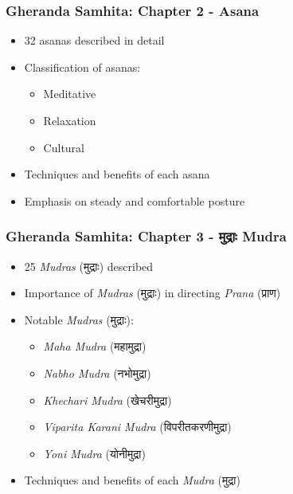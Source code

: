 \begin{frame}[fragile]\frametitle{Gheranda Samhita: Chapter 2 - Asana}
\begin{itemize}
    \item 32 asanas described in detail
    \item Classification of asanas:
    \begin{itemize}
        \item Meditative
        \item Relaxation
        \item Cultural
    \end{itemize}
    \item Techniques and benefits of each asana
    \item Emphasis on steady and comfortable posture
\end{itemize}
\end{frame}

\begin{frame}[fragile]\frametitle{Gheranda Samhita: Chapter 3 - मुद्राः Mudra}
\begin{itemize}
    \item 25 \textit{Mudras} (मुद्राः) described
    \item Importance of \textit{Mudras} (मुद्राः) in directing \textit{Prana} (प्राण)
    \item Notable \textit{Mudras} (मुद्राः):
    \begin{itemize}
        \item \textit{Maha Mudra} (महामुद्रा)
        \item \textit{Nabho Mudra} (नभोमुद्रा)
        \item \textit{Khechari Mudra} (खेचरीमुद्रा)
        \item \textit{Viparita Karani Mudra} (विपरीतकरणीमुद्रा)
        \item \textit{Yoni Mudra} (योनीमुद्रा)
    \end{itemize}
    \item Techniques and benefits of each \textit{Mudra} (मुद्रा)
\end{itemize}
\end{frame}

